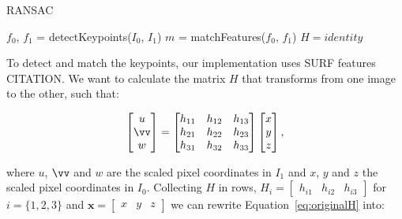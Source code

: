 \documentclass[12pt]{article}
\begin{document}
\begin{algorithm}[H]
 \caption{RANSAC}
 $f_0$, $f_1$ = detectKeypoints($I_0$, $I_1$)\;
 $m$ = matchFeatures($f_0$, $f_1$)\;
 $H = identity$\;
\end{algorithm}

To detect and match the keypoints, our implementation uses SURF features CITATION.
We want to calculate the matrix $H$ that transforms from one image to the other, such that:

\begin{equation}
\begin{bmatrix}
u \\ 
\vv \\ 
w
\end{bmatrix}
= 
\begin{bmatrix}
 h_{11} & h_{12} & h_{13} \\ 
 h_{21} & h_{22} & h_{23}\\ 
 h_{31} & h_{32} & h_{33}
\end{bmatrix}
\begin{bmatrix}
x \\
y \\
z
\end{bmatrix},
\label{eq:originalH}
\end{equation}

where $u$, $\vv$ and $w$ are the scaled pixel coordinates in $I_1$ and $x$, $y$ and $z$ the scaled pixel coordinates in $I_0$.
Collecting $H$ in rows, $H_i = \begin{bmatrix} h_{i1} & h_{i2} & h_{i3} \end{bmatrix}$ for $i = \lbrace 1,2,3 \rbrace$ and $\mathbf{x} = \begin{bmatrix} x & y & z \end{bmatrix}$ we can rewrite Equation~\ref{eq:originalH} into:
\end{document}
